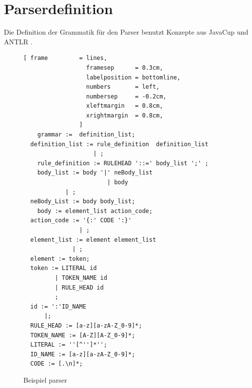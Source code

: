 \section{Parserdefinition}
Die Definition der Grammatik für den Parser benutzt Konzepte aus JavaCup und ANTLR .
\begin{figure}[!ht]
\begin{Verbatim}[ frame         = lines, 
                  framesep      = 0.3cm, 
                  labelposition = bottomline,
                  numbers       = left,
                  numbersep     = -0.2cm,
                  xleftmargin   = 0.8cm,
                  xrightmargin  = 0.8cm,
                ]
	grammar :=  definition_list;
  definition_list := rule_definition  definition_list
                    | ;
	rule_definition := RULEHEAD '::=' body_list ';' ;
	body_list := body '|' neBody_list
						| body
            | ;
  neBody_List := body body_list;
	body := element_list action_code;
  action_code := '{:' CODE ':}'
                | ;
  element_list := element element_list
              | ;
  element := token;
  token := LITERAL id
         | TOKEN_NAME id
         | RULE_HEAD id
         ;
  id := ':'ID_NAME
      |;
  RULE_HEAD := [a-z][a-zA-Z_0-9]*;
  TOKEN_NAME := [A-Z][A-Z_0-9]*;
  LITERAL := ''[^'']*'';
  ID_NAME := [a-z][a-zA-Z_0-9]*;
  CODE := [.\n]*;
\end{Verbatim}
\caption{Beispiel parser}
\label{fig:example_grammer}
\end{figure}
